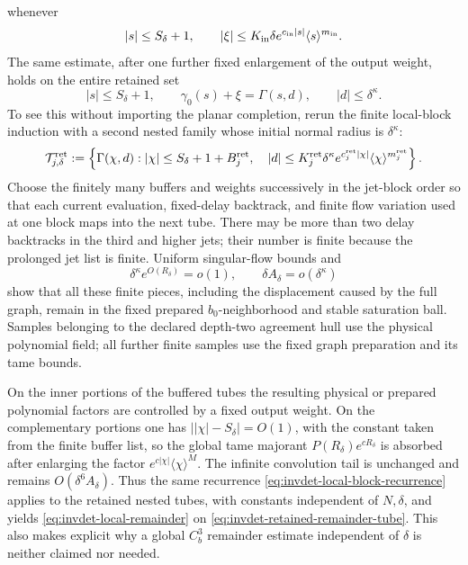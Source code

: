 whenever
\[
 |s|\leq S_\delta+1,\qquad
 |\xi|\leq K_{\rm in}\delta e^{c_{\rm in}|s|}
                     \langle s\rangle^{m_{\rm in}}.
\]
The same estimate, after one further fixed enlargement of the output
weight, holds on the entire retained set
\begin{equation}
 |s|\le S_\delta+1,\qquad
 \gamma_0(s)+\xi=\Gamma(s,d),\qquad |d|\le\delta^\kappa.       \label{eq:invdet-retained-remainder-tube}
\end{equation}
To see this without importing the planar completion, rerun the finite
local-block induction with a second nested family whose initial normal
radius is \(\delta^\kappa\):
\begin{equation}
 \mathcal T^{\rm ret}_{j,\delta}
 :=\left\{\Gamma(\chi,d):
   |\chi|\le S_\delta+1+B_j^{\rm ret},\quad
   |d|\le K_j^{\rm ret}\delta^\kappa
      e^{c_j^{\rm ret}|\chi|}\langle\chi\rangle^{m_j^{\rm ret}}
   \right\}.                                        \label{eq:invdet-retained-nested-tubes}
\end{equation}
Choose the finitely many buffers and weights successively in the jet-block
order so that each current evaluation, fixed-delay backtrack, and finite
flow variation used at one block maps into the next tube.  There may be
more than two delay backtracks in the third and higher jets; their number is
finite because the prolonged jet list is finite.  Uniform singular-flow
bounds and
\[
 \delta^\kappa e^{O(R_\delta)}=o(1),\qquad
 \delta A_\delta=o(\delta^\kappa)
\]
show that all these finite pieces, including the displacement caused by the
full graph, remain in the fixed prepared \(b_0\)-neighborhood and stable
saturation ball.  Samples belonging to the declared depth-two agreement
hull use the physical polynomial field; all further finite samples use the
fixed graph preparation and its tame bounds.

On the inner portions of the buffered tubes the resulting physical or
prepared polynomial factors are controlled by a fixed output weight.  On
the complementary portions one has
\(\bigl||\chi|-S_\delta\bigr|=O(1)\), with the constant taken from the
finite buffer list, so the global tame majorant
\(P(R_\delta)e^{cR_\delta}\) is absorbed after enlarging the factor
\(e^{c|\chi|}\langle\chi\rangle^M\).  The infinite convolution tail is
unchanged and remains \(O(\delta^6A_\delta)\).  Thus the same recurrence
\cref{eq:invdet-local-block-recurrence} applies to the retained nested
tubes, with constants independent of \(N,\delta\), and yields
\cref{eq:invdet-local-remainder} on
\cref{eq:invdet-retained-remainder-tube}.
This also makes explicit why a global
\(C_b^3\) remainder estimate independent of \(\delta\) is neither claimed
nor needed.

